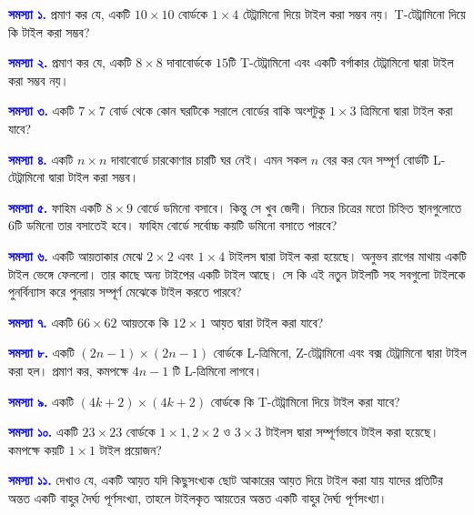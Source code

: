 \documentclass[11pt]{report}
\begin{document}
\begin{flushleft}

\textbf{\textcolor{blue}{সমস্যা ১.}} প্রমাণ কর যে, একটি $10 \times 10$ বোর্ডকে $1 \times 4$ টেট্রামিনো দিয়ে টাইল করা সম্ভব নয়। T-টেট্রামিনো দিয়ে কি টাইল করা সম্ভব?

\textbf{\textcolor{blue}{সমস্যা ২.}} প্রমাণ কর যে, একটি $8 \times 8$ দাবাবোর্ডকে $15$টি T-টেট্রামিনো এবং একটি বর্গাকার টেট্রামিনো দ্বারা টাইল করা সম্ভব নয়।

\textbf{\textcolor{blue}{সমস্যা ৩.}} একটি $7 \times 7$ বোর্ড থেকে কোন ঘরটিকে সরালে বোর্ডের বাকি অংশটুকু $1 \times 3$ ত্রিমিনো দ্বারা টাইল করা যাবে?

\textbf{\textcolor{blue}{সমস্যা ৪.}} একটি $n \times n$ দাবাবোর্ডে চারকোণার চারটি ঘর নেই। এমন সকল $n$ বের কর যেন সম্পূর্ণ বোর্ডটি L-টেট্রামিনো দ্বারা টাইল করা সম্ভব।

\textbf{\textcolor{blue}{সমস্যা ৫.}} ফাহিম একটি $8 \times 9$ বোর্ডে ডমিনো বসাবে। কিন্তু সে খুব জেদী। নিচের চিত্রের মতো চিহ্নিত স্থানগুলোতে $6$টি ডমিনো তার বসাতেই হবে। ফাহিম বোর্ডে সর্বোচ্চ কয়টি ডমিনো বসাতে পারবে?

\begin{center}
\end{center}

\textbf{\textcolor{blue}{সমস্যা ৬.}} একটি আয়তাকার মেঝে $2 \times 2$ এবং $1 \times 4$ টাইলস দ্বারা টাইল করা হয়েছে। অনুভব রাগের মাথায় একটি টাইল ভেঙ্গে ফেললো। তার কাছে অন্য টাইপের একটি টাইল আছে। সে কি এই নতুন টাইলটি সহ সবগুলো টাইলকে পুনর্বিন্যাস করে পুনরায় সম্পূর্ণ মেঝেকে টাইল করতে পারবে?

\textbf{\textcolor{blue}{সমস্যা ৭.}} একটি $66 \times 62$ আয়তকে কি $12 \times 1$ আয়ত দ্বারা টাইল করা যাবে?

\textbf{\textcolor{blue}{সমস্যা ৮.}} একটি $(2n-1) \times (2n-1)$ বোর্ডকে L-ত্রিমিনো, Z-টেট্রামিনো এবং বক্স টেট্রামিনো দ্বারা টাইল করা হল। প্রমাণ কর, কমপক্ষে $4n-1$ টি L-ত্রিমিনো লাগবে।

\textbf{\textcolor{blue}{সমস্যা ৯.}} একটি $(4k+2) \times (4k+2)$ বোর্ডকে কি T-টেট্রামিনো দিয়ে টাইল করা যাবে?

\textbf{\textcolor{blue}{সমস্যা ১০.}} একটি $23 \times 23$ বোর্ডকে $1 \times 1, 2 \times 2$ ও $3 \times 3$ টাইলস দ্বারা সম্পূর্ণভাবে টাইল করা হয়েছে। কমপক্ষে কয়টি $1 \times 1$ টাইল প্রয়োজন?

\textbf{\textcolor{blue}{সমস্যা ১১.}} দেখাও যে, একটি আয়ত যদি কিছুসংখ্যক ছোট আকারের আয়ত দিয়ে টাইল করা যায় যাদের প্রতিটির অন্তত একটি বাহুর দৈর্ঘ্য পূর্ণসংখ্যা, তাহলে টাইলকৃত আয়তের অন্তত একটি বাহুর দৈর্ঘ্য পূর্ণসংখ্যা।

\end{flushleft}
\end{document}
